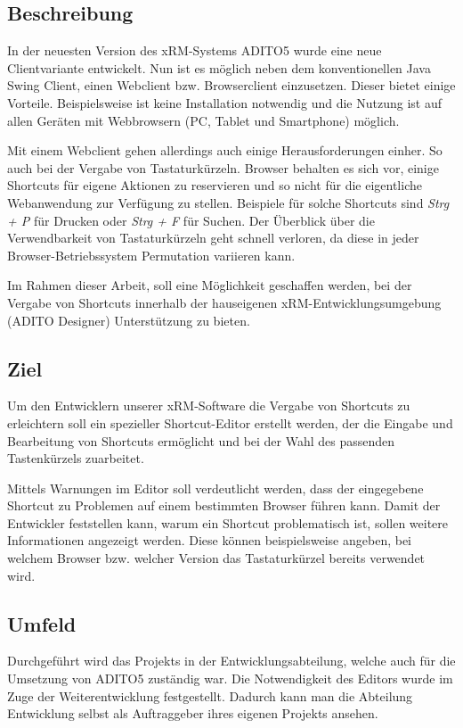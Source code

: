 \subsection{Beschreibung}
 
In der neuesten Version des xRM-Systems ADITO5 wurde eine neue Clientvariante entwickelt. Nun ist es möglich neben dem konventionellen Java Swing Client, einen Webclient bzw. Browserclient einzusetzen. Dieser bietet einige Vorteile. Beispielsweise ist keine Installation notwendig und die Nutzung ist auf allen Geräten mit Webbrowsern (PC, Tablet und Smartphone) möglich. 

Mit einem Webclient gehen allerdings auch einige Herausforderungen einher. So auch bei der Vergabe von Tastaturkürzeln. Browser behalten es sich vor, einige Shortcuts für eigene Aktionen zu reservieren und so nicht für die eigentliche Webanwendung zur Verfügung zu stellen. Beispiele für solche Shortcuts sind \emph{Strg + P} für Drucken oder \emph{Strg + F} für Suchen. Der Überblick über die Verwendbarkeit von Tastaturkürzeln geht schnell verloren, da diese in jeder Browser-Betriebssystem Permutation variieren kann.

Im Rahmen dieser Arbeit, soll eine Möglichkeit geschaffen werden, bei der Vergabe von Shortcuts innerhalb der hauseigenen xRM-Entwicklungsumgebung (ADITO Designer) Unterstützung zu bieten.

\subsection{Ziel}

Um den Entwicklern unserer xRM-Software die Vergabe von Shortcuts zu erleichtern soll ein spezieller Shortcut-Editor erstellt werden, der die Eingabe und Bearbeitung von Shortcuts ermöglicht und bei der Wahl des passenden Tastenkürzels zuarbeitet.

Mittels Warnungen im Editor soll verdeutlicht werden, dass der eingegebene Shortcut zu Problemen auf einem bestimmten Browser führen kann. Damit der Entwickler feststellen kann, warum ein Shortcut problematisch ist, sollen weitere Informationen angezeigt werden. Diese können beispielsweise angeben, bei welchem Browser bzw. welcher Version das Tastaturkürzel bereits verwendet wird.

\subsection{Umfeld}

Durchgeführt wird das Projekts in der Entwicklungsabteilung, welche auch für die Umsetzung von ADITO5 zuständig war. Die Notwendigkeit des Editors wurde im Zuge der Weiterentwicklung festgestellt. Dadurch kann man die Abteilung Entwicklung selbst als Auftraggeber ihres eigenen Projekts ansehen.

